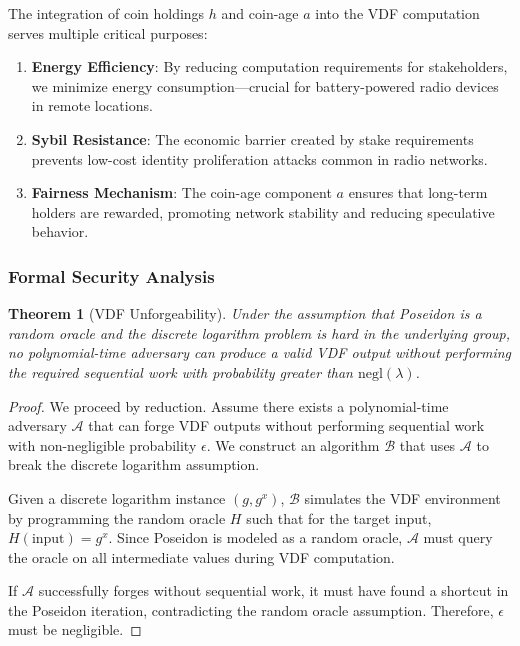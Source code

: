 \documentclass[11pt,a4paper]{article}
\newtheorem{theorem}{Theorem}[section]
\begin{document}
The integration of coin holdings $h$ and coin-age $a$ into the VDF computation serves multiple critical purposes:

\begin{enumerate}
\item \textbf{Energy Efficiency}: By reducing computation requirements for stakeholders, we minimize energy consumption—crucial for battery-powered radio devices in remote locations.

\item \textbf{Sybil Resistance}: The economic barrier created by stake requirements prevents low-cost identity proliferation attacks common in radio networks.

\item \textbf{Fairness Mechanism}: The coin-age component $a$ ensures that long-term holders are rewarded, promoting network stability and reducing speculative behavior.
\end{enumerate}

\subsubsection{Formal Security Analysis}

\begin{theorem}[VDF Unforgeability]
Under the assumption that Poseidon is a random oracle and the discrete logarithm problem is hard in the underlying group, no polynomial-time adversary can produce a valid VDF output without performing the required sequential work with probability greater than $\text{negl}(\lambda)$.
\end{theorem}

\begin{proof}
We proceed by reduction. Assume there exists a polynomial-time adversary $\mathcal{A}$ that can forge VDF outputs without performing sequential work with non-negligible probability $\epsilon$. We construct an algorithm $\mathcal{B}$ that uses $\mathcal{A}$ to break the discrete logarithm assumption.

Given a discrete logarithm instance $(g, g^x)$, $\mathcal{B}$ simulates the VDF environment by programming the random oracle $H$ such that for the target input, $H(\text{input}) = g^x$. Since Poseidon is modeled as a random oracle, $\mathcal{A}$ must query the oracle on all intermediate values during VDF computation.

If $\mathcal{A}$ successfully forges without sequential work, it must have found a shortcut in the Poseidon iteration, contradicting the random oracle assumption. Therefore, $\epsilon$ must be negligible.
\end{proof}
\end{document}
